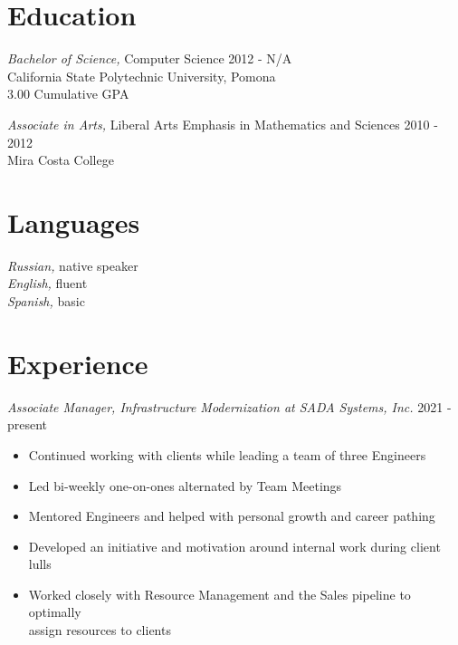\documentclass[line]{docs/resume/res}
\begin{document}
\address{https://smaslennikov.com}
\address{Email: me@smaslennikov.com}

\begin{resume}

\section{Education}
  {\sl Bachelor of Science,} Computer Science \hfill 2012 - N/A\\
  California State Polytechnic University, Pomona \\
  3.00 Cumulative GPA

  {\sl Associate in Arts,} Liberal Arts Emphasis in Mathematics and Sciences \hfill 2010 - 2012 \\
  Mira Costa College

\section{Languages}
  {\sl Russian,} native speaker \\
  {\sl English,} fluent \\
  {\sl Spanish,} basic

\section{Experience}
  {\sl Associate Manager, Infrastructure Modernization at SADA Systems, Inc.} \hfill 2021 - present
  \begin{itemize} \itemsep -2pt
    \item Continued working with clients while leading a team of three Engineers
    \item Led bi-weekly one-on-ones alternated by Team Meetings
    \item Mentored Engineers and helped with personal growth and career pathing
    \item Developed an initiative and motivation around internal work during client lulls
    \item Worked closely with Resource Management and the Sales pipeline to optimally \\
      assign resources to clients
  \end{itemize}


\end{resume}
\end{document}
